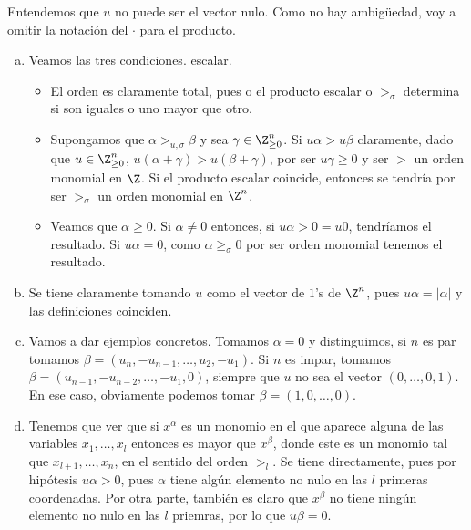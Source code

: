 \documentclass[twoside]{article}
\begin{document}
\begin{solucion}
Entendemos que $u$ no puede ser el vector nulo.  Como no hay ambigüedad, voy a omitir la notación del $\cdot$ para el producto. 
\begin{enumerate}[a.]
\item Veamos las tres condiciones. escalar.
\begin{itemize}
\item El orden es claramente total, pues o el producto escalar o $>_\sigma$ determina si son iguales o uno mayor que otro.
\item Supongamos que $\alpha >_{u,\sigma} \beta$ y sea $\gamma \in \Z^n_{\geq 0}$. Si $u\alpha > u\beta$ claramente, dado que $u\in \Z^n_{\geq 0}$, $u( \alpha+\gamma) > u(\beta + \gamma)$, por ser $u\gamma \geq 0$ y ser $>$ un orden monomial en $\Z$. Si el producto escalar coincide, entonces se tendría por ser $>_{\sigma}$ un orden monomial en $\Z^n$.
\item Veamos que $\alpha \geq 0$. Si $\alpha \neq 0$ entonces, si $u\alpha >0 = u0$, tendríamos el resultado. Si $u\alpha =0$, como $\alpha \geq_{\sigma} 0$ por ser orden monomial tenemos el resultado.
\end{itemize}
\item Se tiene claramente tomando $u$ como el vector de $1$'s de $\Z^n$, pues $u\alpha=|\alpha|$ y las definiciones coinciden.
\item Vamos a dar ejemplos concretos. Tomamos $\alpha=0$ y distinguimos, si $n$ es par tomamos $\beta=(u_n,-u_{n-1},\dotsc,u_2,-u_1)$. Si $n$ es impar, tomamos $\beta=(u_{n-1},-u_{n-2},\dotsc,-u_1,0)$, siempre que $u$ no sea el vector $(0,\dotsc,0,1)$. En ese caso, obviamente podemos tomar $\beta=(1,0,\dotsc,0)$.
\item Tenemos que ver que si $x^\alpha$ es un monomio en el que aparece alguna de las variables $x_1,\dotsc,x_l$ entonces es mayor que $x^\beta$, donde este es un monomio tal que $x_{l+1},\dotsc,x_n$, en el sentido del orden $>_l$. Se tiene directamente, pues por hipótesis $u \alpha >0$, pues $\alpha$ tiene algún elemento no nulo en las $l$ primeras coordenadas. Por otra parte, también es claro que $x^\beta$ no tiene ningún elemento no nulo en las $l$ priemras, por lo que $u\beta =0$. 
\end{enumerate}
\end{solucion}
\end{document}
